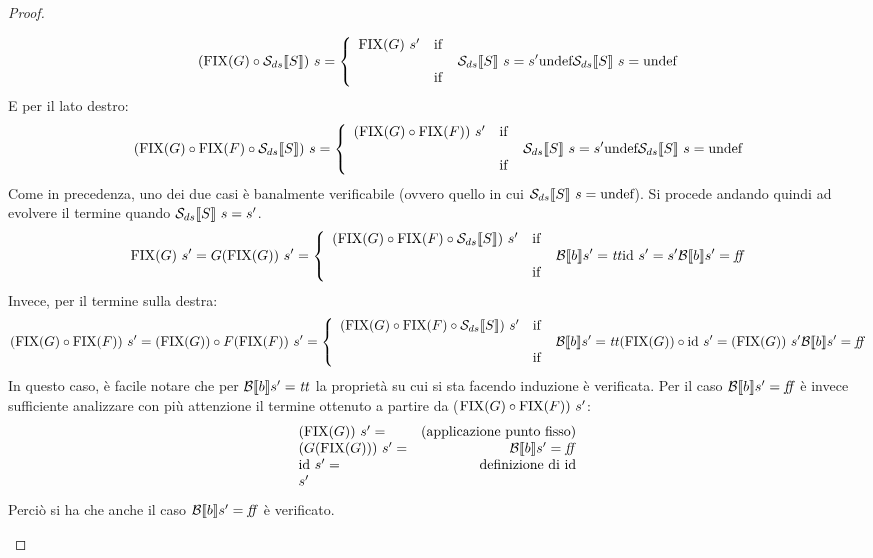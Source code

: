 {\begin{proof}
\begin{itemize}
  $$
  (\fixp{G} \circ \dsCtxt{S})\ s
      = \caseFun{\fixp{G}\ s'}
                {\dsCtxt{S}\ s = s'}
                {\undefDS}
                {\dsCtxt{S}\ s = \undefDS}
  $$
  E per il lato destro:
  $$
  (\fixp{G} \circ \fixp{F} \circ \dsCtxt{S})\ s
      = \caseFun{(\fixp{G} \circ \fixp{F})\ s'}
                {\dsCtxt{S}\ s = s'}
                {\undefDS}
                {\dsCtxt{S}\ s = \undefDS}
  $$
  Come in precedenza, uno dei due casi è banalmente verificabile (ovvero quello
  in cui $\mathcal{S}_{ds}\llbracket S \rrbracket\ s = \textrm{\normalfont{undef}}$). Si procede andando quindi ad evolvere il
  termine quando $\mathcal{S}_{ds}\llbracket S \rrbracket\ s = s'$.
  $$
  \fixp{G}\ s' =
  G(\fixp{G})\ s' = \caseFun{(\fixp{G} \circ \fixp{F} \circ \dsCtxt{S})\ s'}
                        {\B{b}' = \semtrue}
                        {\idDS\ s' = s'}
                        {\B{b}' = \semfalse}
  $$
  Invece, per il termine sulla destra:
  $$
  (\fixp{G} \circ \fixp{F})\ s' =
  (\fixp{G}) \circ F (\fixp{F})\ s' =
                \caseFun{(\fixp{G} \circ \fixp{F} \circ \dsCtxt{S})\ s'}
                        {\B{b}' = \semtrue}
                        {(\fixp{G}) \circ \idDS\ s' = (\fixp{G})\ s'}
                        {\B{b}' = \semfalse}
  $$
  In questo caso, è facile notare che per $\mathcal{B} \llbracket b \rrbracket s' = \mbox{\textit{tt}}$ la proprietà su
  cui si sta facendo induzione è verificata. Per il caso $\mathcal{B} \llbracket b \rrbracket s' = \mbox{\textit{ff}}$ è
  invece sufficiente analizzare con più attenzione il termine ottenuto a
  partire da ($\textrm{\normalfont{FIX}}(G) \circ \textrm{\normalfont{FIX}}(F))\ s'$:
  $$
  \begin{array}{lr}
  (\textrm{\normalfont{FIX}}(G))\ s' = & (\text{applicazione punto fisso}) \\
  (G (\textrm{\normalfont{FIX}}(G)))\ s' = & \mathcal{B} \llbracket b \rrbracket s' = \mbox{\textit{ff}} \\
  \textrm{\normalfont{id}}\ s' = & \text{definizione di \textrm{\normalfont{id}}} \\
  s'
  \end{array}
  $$
  Perciò si ha che anche il caso $\mathcal{B} \llbracket b \rrbracket s' = \mbox{\textit{ff}}$ è verificato.



\end{itemize}
\end{proof}}
